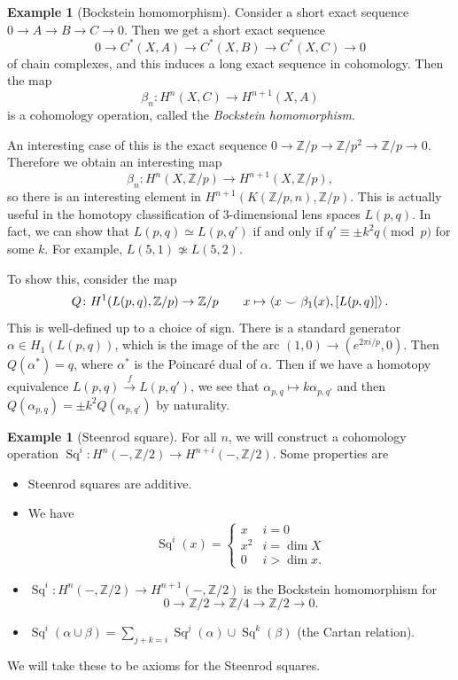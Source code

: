 \documentclass[leqno, openany]{memoir}
\theoremstyle{definition}
\newtheorem{exm}[thm]{Example}
\theoremstyle{remark}
\theoremstyle{plain}
\theoremstyle{definition}
\theoremstyle{remark}
\newcommand{\Z}{\mathbb{Z}}
\DeclareMathOperator{\Sq}{Sq}
\begin{document}
\begin{exm}[Bockstein homomorphism] Consider a short exact sequence $0 \to A
    \to B \to C \to 0$. Then we get a short exact sequence \[ 0 \to C^*(X, A)
    \to C^*(X,B) \to C^*(X,C) \to 0 \] of chain complexes, and this induces a
    long exact sequence in cohomology. Then the map \[ \beta_n \colon H^n(X, C)
    \to H^{n+1}(X, A) \] is a cohomology operation, called the
    \textit{Bockstein homomorphism}.

    An interesting case of this is the exact sequence $0 \to \Z/p \to \Z/p^2
    \to \Z/p \to 0$. Therefore we obtain an interesting map \[ \beta_n \colon
    H^n(X, \Z/p) \to H^{n+1}(X, \Z/p), \] so there is an interesting element in
    $H^{n+1}(K(\Z/p, n), \Z/p)$. This is actually useful in the homotopy
    classification of $3$-dimensional lens spaces $L(p,q)$. In fact, we can
    show that $L(p,q) \simeq L(p,q')$ if and only if $q' \equiv \pm k^2 q \pmod
    p$ for some $k$. For example, $L(5,1) \not\simeq L(5,2)$.

    To show this, consider the map \[ Q \colon H^1(L(p,q), \Z/p) \to \Z/p
    \qquad x \mapsto \ev{x \smile \beta_1(x), [L(p,q)]}. \] This is
    well-defined up to a choice of sign. There is a standard generator $\alpha
    \in H_1(L(p,q))$, which is the image of the arc $(1,0) \to (e^{2\pi i/p},
    0)$. Then $Q(\alpha^*) = q$, where $\alpha^*$ is the Poincar\'e dual of
    $\alpha$. Then if we have a homotopy equivalence $L(p,q) \xrightarrow{f}
    L(p,q')$, we see that $\alpha_{p,q} \mapsto k \alpha_{p,q'}$ and then
    $Q(\alpha_{p,q}) = \pm k^2 Q(\alpha_{p,q'})$ by naturality.  \end{exm}

\begin{exm}[Steenrod square] For all $n$, we will construct a cohomology
    operation $\Sq^i \colon H^n(-, \Z/2) \to H^{n+i}(-, \Z/2)$. Some properties
    are \begin{itemize} \item Steenrod squares are additive.  \item We have \[
        \Sq^i(x) = \begin{cases} x & i = 0 \\ x^2 & i = \dim X \\ 0 & i > \dim
            x.  \end{cases} \] \item $\Sq^i \colon H^n(-,\Z/2) \to
            H^{n+1}(-,\Z/2)$ is the Bockstein homomorphism for \[ 0 \to \Z/2
            \to \Z/4 \to \Z/2 \to 0. \] \item $\Sq^i(\alpha \cup \beta) =
            \sum_{j+k=i} \Sq^j(\alpha) \cup \Sq^k(\beta)$ (the Cartan
            relation).  \end{itemize} We will take these to be axioms for the
        Steenrod squares.  \end{exm}
\end{document}
